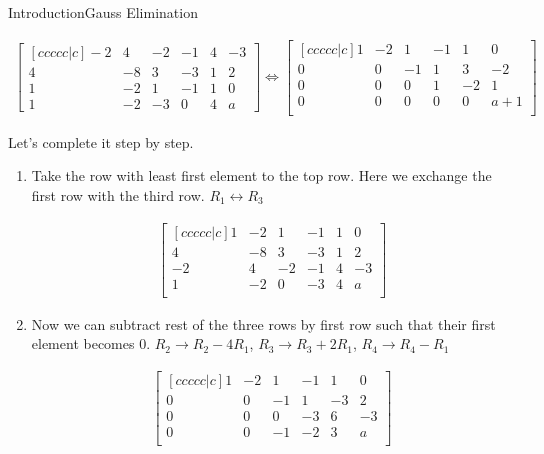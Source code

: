 \documentclass[10pt]{beamer}
\begin{document}
\begin{frame}[shrink=20]{Introduction}{Gauss Elimination}

\begin{align}
\begin{bmatrix}[ccccc|c]
   -2 & 4 & -2 & -1 & 4 & -3 \\
   4 & -8 & 3 & -3 & 1 & 2\\
   1 & -2 & 1 & -1 & 1 & 0\\
   1 & -2 & -3 & 0 & 4 & a
\end{bmatrix} \Leftrightarrow 
\begin{bmatrix}[ccccc|c]  1 & -2 & 1 & -1 & 1 &  0 \\  0 & 0 & -1 & 1 & 3 &  -2\\ 0 & 0 & 0 & 1 & -2 &  1\\ 0 & 0 & 0 & 0 & 0 &  a+1\\ \end{bmatrix}
\end{align}

Let's complete it step by step.
\begin{enumerate}

\pause
\item  Take the row with least first element to the top row. Here we exchange the first row with the third row. $R_{1} \leftrightarrow R_{3}$ 

\begin{align}
\begin{bmatrix}[ccccc|c]  1 & -2 & 1 & -1 & 1 &  0 \\  4 & -8 & 3 & -3 & 1 &  2\\ -2 & 4 & -2 & -1 & 4 &  -3\\ 1 & -2 & 0 & -3 & 4 &  a\\ \end{bmatrix}
\end{align}

\pause
\item Now we can subtract rest of the three rows by first row such that their first element becomes 0. $R_{2} \rightarrow R_{2}-4R_{1}$, $R_{3} \rightarrow R_{3}+2R_{1}$, $R_{4} \rightarrow R_{4}-R_{1}$ 

\begin{align}
\begin{bmatrix}[ccccc|c]  1 & -2 & 1 & -1 & 1 &  0 \\  0 & 0 & -1 & 1 & -3 &  2\\ 0 & 0 & 0 & -3 & 6 &  -3\\ 0 & 0 & -1 & -2 & 3 &  a\\ \end{bmatrix}
\end{align}

\end{enumerate}

\end{frame}
\end{document}
